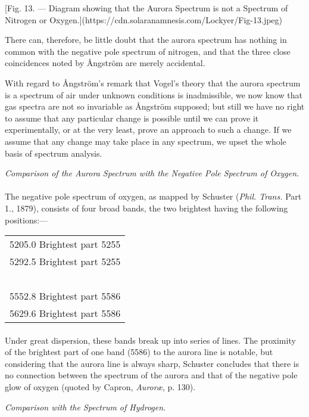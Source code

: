 \documentclass[a4paper, 12pt, oneside, polutonikogreek, english]{article}
\begin{document}
[Fig. 13. --- Diagram showing that the Aurora Spectrum is not a Spectrum of Nitrogen or Oxygen.](https://cdn.solaranamnesis.com/Lockyer/Fig-13.jpeg)

There can, therefore, be little doubt that the aurora spectrum has nothing in common with the negative pole spectrum of nitrogen, and that the three close coincidences noted by Ångström are merely accidental.

With regard to Ångström's remark that Vogel's theory that the aurora spectrum is a spectrum of air under unknown conditions is inadmissible, we now know that gas spectra are not so invariable as Ångström supposed; but still we have no right to assume that any particular change is possible until we can prove it experimentally, or at the very least, prove an approach to such a change. If we assume that any change may take place in any spectrum, we upset the whole basis of spectrum analysis.
\begin{center}
\emph{Comparison of the Aurora Spectrum with the Negative Pole Spectrum of Oxygen.}
\end{center}
\paragraph{}
The negative pole spectrum of oxygen, as mapped by Schuster (\emph{Phil. Trans.} Part 1., 1879), consists of four broad bands, the two brightest having the following positions:---
\begin{table}[H]
    \centering
    \begin{tabular}{l}
        5205.0 Brightest part 5255 \\
        5292.5 Brightest part 5255 \\
         ~ \\
        5552.8 Brightest part 5586 \\
        5629.6 Brightest part 5586 \\
    \end{tabular}
\end{table}
\paragraph{}
Under great dispersion, these bands break up into series of lines. The proximity of the brightest part of one band (5586) to the aurora line is notable, but considering that the aurora line is always sharp, Schuster concludes that there is no connection between the spectrum of the aurora and that of the negative pole glow of oxygen (quoted by Capron, \emph{Auroræ}, p. 130).
\begin{center}
\emph{Comparison with the Spectrum of Hydrogen.}
\end{center}
\end{document}
